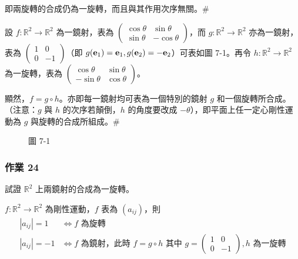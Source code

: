 即兩旋轉的合成仍為一旋轉，而且與其作用次序無關。\hfill$\#$

\begin{discussion}\label{disc:b6-1-5}
設 $f: \mathbb{R}^2 \longrightarrow \mathbb{R}^2$ 為一鏡射，表為 $\begin{pmatrix} \cos\theta & \sin\theta \\ \sin\theta & -\cos\theta \end{pmatrix}$，而 $g: \mathbb{R}^2 \longrightarrow \mathbb{R}^2$ 亦為一鏡射，表為 $\begin{pmatrix} 1 & 0 \\ 0 & -1 \end{pmatrix}$（即 $g(\boldsymbol{\mathbf{e}}_1) = \boldsymbol{\mathbf{e}}_1, g(\boldsymbol{\mathbf{e}}_2) = -\boldsymbol{\mathbf{e}}_2$）可表如圖 7-1。再令 $h: \mathbb{R}^2 \longrightarrow \mathbb{R}^2$ 為一旋轉，表為 $\begin{pmatrix} \cos\theta & \sin\theta \\ -\sin\theta & \cos\theta \end{pmatrix}$。

顯然，$f = g \circ h$。亦即每一鏡射均可表為一個特別的鏡射 $g$ 和一個旋轉所合成。（注意：$g$ 與 $h$ 的次序若顛倒，$h$ 的角度要改成 $-\theta$），即平面上任一定心剛性運動為 $g$ 與旋轉的合成所組成。\hfill$\#$
\end{discussion}

\begin{figure}[H]
\centering
{}
\caption*{圖 7-1}\label{fig:b6-7-1}
\end{figure}

\subsubsection*{作業 24}\label{hw:b6-1-24}
試證 $\mathbb{R}^2$ 上兩鏡射的合成為一旋轉。

\begin{theorem}\label{thm:b6-1-20}
$f: \mathbb{R}^2 \longrightarrow \mathbb{R}^2$ 為剛性運動，$f$ 表為 $(a_{ij})$，則
\begin{align*}
|a_{ij}| = 1 &\iff f \text{ 為旋轉} \\
|a_{ij}| = -1 &\iff f \text{ 為鏡射，此時 } f = g \circ h \text{ 其中 } g = \begin{pmatrix} 1 & 0 \\ 0 & -1 \end{pmatrix}, h \text{ 為一旋轉}
\end{align*}
\end{theorem}

